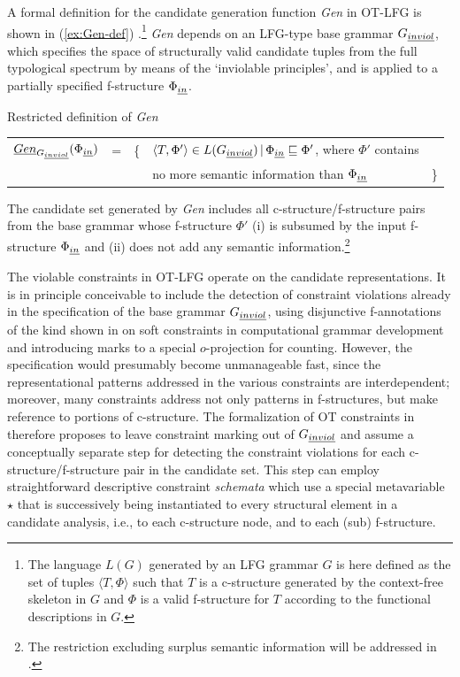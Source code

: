 \documentclass[output=paper,hidelinks]{langscibook}
\begin{document}
\newpage

A formal definition for the candidate generation function \emph{Gen} in OT-LFG is shown in (\ref{ex:Gen-def}) \citep[][74]{Kuhn-CSLI-book}.\footnote{The language $L(G)$ generated by an LFG grammar $G$ is here defined as the set of tuples $\langle T, \Phi\rangle$ such that $T$ is a c-structure generated by the context-free skeleton in $G$ and $\Phi$ is a valid f-structure for $T$ according to the functional descriptions in $G$. } 
\emph{Gen} depends on an LFG-type base grammar $G_{\emph{inviol}}$, which specifies the space of structurally valid candidate tuples from the full typological spectrum by means of the `inviolable principles', and is applied to a partially specified f-structure $\Phi_{\emph{in}}$.

\ea\label{ex:Gen-def}
Restricted definition of \emph{Gen}\\
\setlength{\tabcolsep}{3pt}
\begin{tabular}[t]{lllll}
 $\emph{Gen}_{G_{\emph{inviol}}}(\Phi_{\emph{in}})$ & = & \{ & $\langle T, \Phi'\rangle\in L(G_{\emph{inviol}}) \, |  \, \Phi_{\emph{in}} \sqsubseteq \Phi'$, where $\Phi'$ contains  &  \\
  & & & no more semantic information than $\Phi_{\emph{in}}$ & \} \\
\end{tabular}
\z


\noindent
The candidate set generated by \emph{Gen} includes all c-structure/f-structure pairs from the base grammar whose f-structure $\Phi'$ (i) is subsumed by the input f-structure $\Phi_{\emph{in}}$ and (ii) does not add any semantic information.\footnote{The restriction excluding surplus semantic information will be addressed in .}

The violable constraints in OT-LFG operate on the candidate representations. It is in principle conceivable to include the detection of constraint violations already in the specification of the base grammar $G_{\emph{inviol}}$, using disjunctive f-annota\-tions of the kind shown in  on soft constraints in computational grammar development and introducing marks to a special $o$-projection for counting. However, the specification would presumably become unmanageable fast, since the representational patterns addressed in the various constraints are interdependent; moreover, many constraints address not only patterns in f-structures, but make reference to portions of c-structure. The formalization of OT constraints in \citet[][ch.~4]{Kuhn-CSLI-book} therefore proposes to leave constraint marking out of $G_{\emph{inviol}}$ and assume a conceptually separate step for detecting the constraint violations for each c-structure/f-structure pair in the candidate set. This step can employ straightforward descriptive constraint \emph{schemata} which use a special metavariable $\star$ that is successively being instantiated to every structural element in a candidate analysis, i.e., to each c-structure node, and to each (sub) f-structure.
\end{document}
